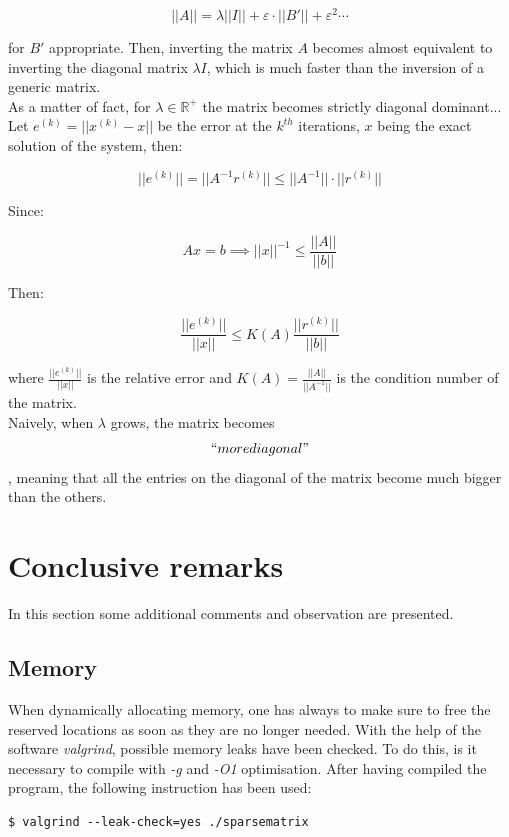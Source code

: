 \documentclass{article}
\theoremstyle{theorem}
\theoremstyle{definition}
\begin{document}
$$||A||=\lambda||I||+\varepsilon\cdot ||B'||+ \varepsilon^2\cdots$$

for $B'$ appropriate. Then, inverting the matrix $A$ becomes almost equivalent to inverting the diagonal matrix $\lambda I$, which is much faster than the inversion of a generic matrix.\\


As a matter of fact, for $\lambda\in\mathbb{R}^{+}$ the matrix becomes strictly diagonal dominant...\\






Let $e^{(k)}=||x^{(k)}-x||$ be the error at the $k^{th}$ iterations, $x$ being the exact solution of the system, then:

$$||e^{(k)}||=||A^{-1}r^{(k)}||\le||A^{-1}||\cdot ||r^{(k)}||$$ 

Since:

$$ Ax=b\implies ||x||^{-1}\le\frac{||A||}{||b||} $$

Then:

$$\frac{||e^{(k)}||}{||x||}\le K(A)\frac{||r^{(k)}||}{||b||}$$

where $\frac{||e^{(k)}||}{||x||}$ is the relative error and $K(A)=\frac{||A||}{||A^{-1}||}$ is the condition number of the matrix.\\
Naively, when $\lambda$ grows, the matrix becomes $$``more diagonal"$$, meaning that all the entries on the diagonal of the matrix become much bigger than the others.




\section{Conclusive remarks}
In this section some additional comments and observation are presented.

\subsection{Memory}
When dynamically allocating memory, one has always to make sure to free the reserved locations as soon as they are no longer needed. With the help of the software \emph{valgrind}, possible memory leaks have been checked. To do this, is it necessary to compile with \emph{-g} and \emph{-O1} optimisation. After having compiled the program, the following instruction has been used:

\begin{verbatim}
$ valgrind --leak-check=yes ./sparsematrix
\end{verbatim}
\end{document}
